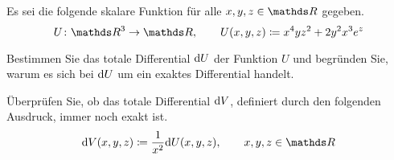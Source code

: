 \begin{atiTask}[
  title = Vollständiges Differential
]
  Es sei die folgende skalare Funktion für alle $x,y,z\in\setR$ gegeben.
  \[
    \func{U}{\setR^3}{\setR}\separate U(x,y,z)\define x^4yz^2 + 2y^2x^3e^z
  \]
  \begin{atiSubtasks}
    \item{
      Bestimmen Sie das totale Differential $\mathrm{d} U$ der Funktion $U$ und begründen Sie, warum es sich bei $\mathrm{d} U$ um ein exaktes Differential handelt.
    }
    \item{
      Überprüfen Sie, ob das totale Differential $\mathrm{d} V$, definiert durch den folgenden Ausdruck, immer noch exakt ist.
      \[
        \diff V(x,y,z)\define \frac{1}{x^2} \diff U(x,y,z) \separate x,y,z\in\setR
      \]
    }
  \end{atiSubtasks}
\end{atiTask}